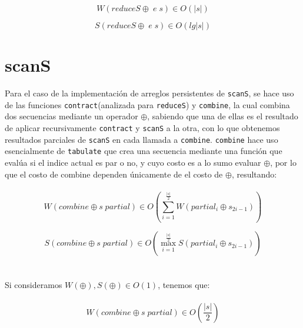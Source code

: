 \documentclass[a4paper,10pt]{article}
\begin{document}
		\begin{equation*}
			W \left( reduceS \oplus \; e \; s \right) \in O \left( \vert s \vert \right)
		\end{equation*}
		
		\begin{equation*}
			S \left( reduceS \oplus \; e \; s \right) \in O \left( lg \vert s \vert \right)
		\end{equation*}

\pagebreak
	\section*{\Large scanS}
		Para el caso de la implementación de arreglos persistentes de \texttt{scanS}, se hace uso de las funciones \texttt{contract}(analizada para \texttt{reduceS}) y \texttt{combine}, la cual combina dos secuencias mediante un operador $\oplus$, sabiendo que una de ellas es el resultado de aplicar recursivamente \texttt{contract} y \texttt{scanS} a la otra, con lo que obtenemos resultados parciales de \texttt{scanS} en cada llamada a \texttt{combine}.
	\texttt{combine} hace uso esencialmente de \texttt{tabulate} que crea una secuencia mediante una función que evalúa si el indice actual es par o no, y cuyo costo es a lo sumo evaluar $\oplus$, por lo que el costo de combine dependen únicamente de el costo de $\oplus$, resultando:
\\
\\
\begin{equation*}
    W \left( combine \oplus s \; partial \right) \in
    O \left( \sum_{i=1}^{\frac{\vert s \vert}{2}} W \left( partial_{i} \oplus s_{2i-1} \right) \right)
\end{equation*}

\begin{equation*}
    S \left( combine \oplus s \; partial \right) \in
    O \left( \max_{i=1}^{\frac{\vert s \vert}{2}} S \left( partial_{i} \oplus s_{2i-1} \right) \right)
\end{equation*}
\\
\\
		Si consideramos $W(\oplus), S(\oplus) \in O(1)$, tenemos que:
\\
\\		
		\begin{equation*}
			W \left( combine \oplus s \; partial \right) \in O \left( \frac{\vert s \vert}{2} \right)
		\end{equation*}
		
\end{document}
